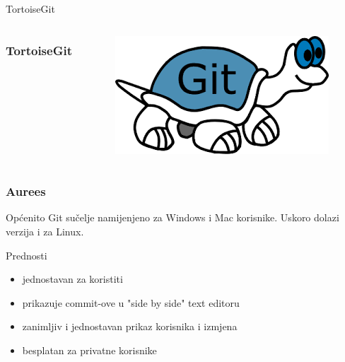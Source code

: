 \documentclass[hyperref={bookmarks=false},aspectratio=169]{beamer}
\begin{document}
\begin{frame}{TortoiseGit}
    
    \begin{columns}
\frametitle{TortoiseGit}
\begin{figure}


\includegraphics[width=\columnwidth]{./figures/tortoisegit.png}
    \centering
    
\end{figure}
    
\end{columns}
    

\end{frame}

\begin{frame}
\frametitle{Aurees}

    
\begin{block}{\tiny{Općenito}}
Git sučelje namijenjeno za Windows i Mac korisnike. Uskoro dolazi verzija i za Linux.
\end{block}

\begin{block}{Prednosti}
    
    \begin{itemize}
        \item jednostavan za koristiti
        \item prikazuje commit-ove u "side by side" text editoru
        \item zanimljiv i jednostavan prikaz korisnika i izmjena
        \item besplatan za privatne korisnike
    \end{itemize}
\end{block}

\end{frame}
\end{document}
